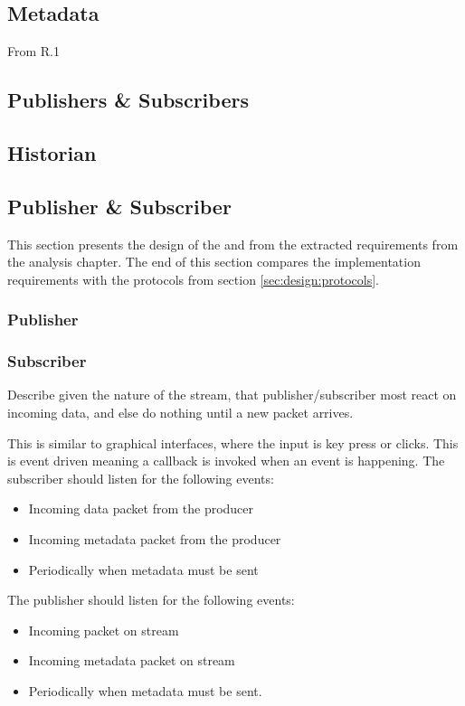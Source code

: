 \subsection{Metadata}
From R.1
\subsection{Publishers \& Subscribers}
\subsection{Historian}



\subsection{Publisher \& Subscriber}
This section presents the design of the  and  from the extracted requirements from the analysis chapter. The end of this section compares the implementation requirements with the protocols from section \ref{sec:design:protocols}.

\subsubsection{Publisher}

\subsubsection{Subscriber}

Describe given the nature of the stream, that publisher/subscriber most react on incoming data, and else do nothing until a new packet arrives.

This is similar to graphical interfaces, where the input is key press or clicks. This is event driven meaning a callback is invoked when an event is happening.
The subscriber should listen for the following events:
\begin{itemize}
	\item Incoming data packet from the producer
	\item Incoming metadata packet from the producer
	\item Periodically when metadata must be sent
\end{itemize}

The publisher should listen for the following events:
\begin{itemize}
	\item Incoming packet on stream
	\item Incoming metadata packet on stream
	\item Periodically when metadata must be sent.
\end{itemize}

